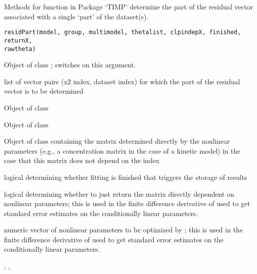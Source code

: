 \documentclass{article}
\begin{document}
\begin{Description}\relax
Methods for function  in Package `TIMP' determine the 
part of the residual vector associated with a single `part' of the
dataset(s).
\end{Description}
\begin{Usage}
\begin{verbatim}
residPart(model, group, multimodel, thetalist, clpindepX, finished, returnX,
rawtheta)
\end{verbatim}
\end{Usage}
\begin{Arguments}
\begin{ldescription}
\item[\code{model}] Object of class ; switches on this 
argument. 
\item[\code{group}] list of vector pairs (x2 index, dataset index) for which 
the part of the residual vector is to be determined
\item[\code{multimodel}] Object of class 
\item[\code{thetalist}] Object of class 
\item[\code{clpindepX}] Object of class  containing the matrix
determined directly by the nonlinear parameters (e.g., a concentration matrix
in the case of a kinetic model) in the case that this matrix does not depend
on the  index
\item[\code{finished}] logical determining whether fitting is finished that
triggers the storage of results
\item[\code{returnX}] logical determining whether to just return the matrix 
 directly dependent on nonlinear parameters; this is used in the finite
difference derivative of  used to get standard error estimates on the 
conditionally linear parameters. 
\item[\code{rawtheta}] numeric vector of nonlinear parameters to be optimized 
by ; this is used in the finite
difference derivative of  used to get standard error estimates on the 
conditionally linear parameters.

\end{ldescription}
\end{Arguments}
\begin{SeeAlso}\relax
{}, ,
\end{SeeAlso}
\end{document}
